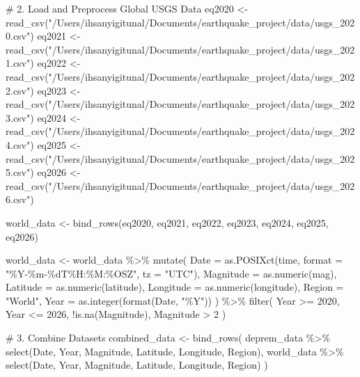 \documentclass[
  11pt,
  a4paper,
  DIV=11,
  numbers=noendperiod]{scrartcl}
\newenvironment{Shaded}{\begin{snugshade}}{\end{snugshade}}
\newcommand{\AttributeTok}[1]{\textcolor[rgb]{0.40,0.45,0.13}{#1}}
\newcommand{\CommentTok}[1]{\textcolor[rgb]{0.37,0.37,0.37}{#1}}
\newcommand{\DecValTok}[1]{\textcolor[rgb]{0.68,0.00,0.00}{#1}}
\newcommand{\FunctionTok}[1]{\textcolor[rgb]{0.28,0.35,0.67}{#1}}
\newcommand{\NormalTok}[1]{\textcolor[rgb]{0.00,0.23,0.31}{#1}}
\newcommand{\OtherTok}[1]{\textcolor[rgb]{0.00,0.23,0.31}{#1}}
\newcommand{\SpecialCharTok}[1]{\textcolor[rgb]{0.37,0.37,0.37}{#1}}
\newcommand{\StringTok}[1]{\textcolor[rgb]{0.13,0.47,0.30}{#1}}
\begin{document}
\begin{Shaded}
\begin{Highlighting}[]
\CommentTok{\# 2. Load and Preprocess Global USGS Data}
\NormalTok{eq2020 }\OtherTok{\textless{}{-}} \FunctionTok{read\_csv}\NormalTok{(}\StringTok{"/Users/ihsanyigitunal/Documents/earthquake\_project/data/usgs\_2020.csv"}\NormalTok{)}
\NormalTok{eq2021 }\OtherTok{\textless{}{-}} \FunctionTok{read\_csv}\NormalTok{(}\StringTok{"/Users/ihsanyigitunal/Documents/earthquake\_project/data/usgs\_2021.csv"}\NormalTok{)}
\NormalTok{eq2022 }\OtherTok{\textless{}{-}} \FunctionTok{read\_csv}\NormalTok{(}\StringTok{"/Users/ihsanyigitunal/Documents/earthquake\_project/data/usgs\_2022.csv"}\NormalTok{)}
\NormalTok{eq2023 }\OtherTok{\textless{}{-}} \FunctionTok{read\_csv}\NormalTok{(}\StringTok{"/Users/ihsanyigitunal/Documents/earthquake\_project/data/usgs\_2023.csv"}\NormalTok{)}
\NormalTok{eq2024 }\OtherTok{\textless{}{-}} \FunctionTok{read\_csv}\NormalTok{(}\StringTok{"/Users/ihsanyigitunal/Documents/earthquake\_project/data/usgs\_2024.csv"}\NormalTok{)}
\NormalTok{eq2025 }\OtherTok{\textless{}{-}} \FunctionTok{read\_csv}\NormalTok{(}\StringTok{"/Users/ihsanyigitunal/Documents/earthquake\_project/data/usgs\_2025.csv"}\NormalTok{)}
\NormalTok{eq2026 }\OtherTok{\textless{}{-}} \FunctionTok{read\_csv}\NormalTok{(}\StringTok{"/Users/ihsanyigitunal/Documents/earthquake\_project/data/usgs\_2026.csv"}\NormalTok{)}

\NormalTok{world\_data }\OtherTok{\textless{}{-}} \FunctionTok{bind\_rows}\NormalTok{(eq2020, eq2021, eq2022, eq2023, eq2024, eq2025, eq2026)}

\NormalTok{world\_data }\OtherTok{\textless{}{-}}\NormalTok{ world\_data }\SpecialCharTok{\%\textgreater{}\%}
  \FunctionTok{mutate}\NormalTok{(}
    \AttributeTok{Date =} \FunctionTok{as.POSIXct}\NormalTok{(time, }\AttributeTok{format =} \StringTok{"\%Y{-}\%m{-}\%dT\%H:\%M:\%OSZ"}\NormalTok{, }\AttributeTok{tz =} \StringTok{"UTC"}\NormalTok{),}
    \AttributeTok{Magnitude =} \FunctionTok{as.numeric}\NormalTok{(mag),}
    \AttributeTok{Latitude =} \FunctionTok{as.numeric}\NormalTok{(latitude),}
    \AttributeTok{Longitude =} \FunctionTok{as.numeric}\NormalTok{(longitude),}
    \AttributeTok{Region =} \StringTok{"World"}\NormalTok{,}
    \AttributeTok{Year =} \FunctionTok{as.integer}\NormalTok{(}\FunctionTok{format}\NormalTok{(Date, }\StringTok{"\%Y"}\NormalTok{))}
\NormalTok{  ) }\SpecialCharTok{\%\textgreater{}\%}
  \FunctionTok{filter}\NormalTok{(}
\NormalTok{    Year }\SpecialCharTok{\textgreater{}=} \DecValTok{2020}\NormalTok{,}
\NormalTok{    Year }\SpecialCharTok{\textless{}=} \DecValTok{2026}\NormalTok{,}
    \SpecialCharTok{!}\FunctionTok{is.na}\NormalTok{(Magnitude),}
\NormalTok{    Magnitude }\SpecialCharTok{\textgreater{}} \DecValTok{2}
\NormalTok{  )}

\CommentTok{\# 3. Combine Datasets}
\NormalTok{combined\_data }\OtherTok{\textless{}{-}} \FunctionTok{bind\_rows}\NormalTok{(}
\NormalTok{  deprem\_data }\SpecialCharTok{\%\textgreater{}\%} \FunctionTok{select}\NormalTok{(Date, Year, Magnitude, Latitude, Longitude, Region),}
\NormalTok{  world\_data }\SpecialCharTok{\%\textgreater{}\%} \FunctionTok{select}\NormalTok{(Date, Year, Magnitude, Latitude, Longitude, Region)}
\NormalTok{)}
\end{Highlighting}
\end{Shaded}
\end{document}
